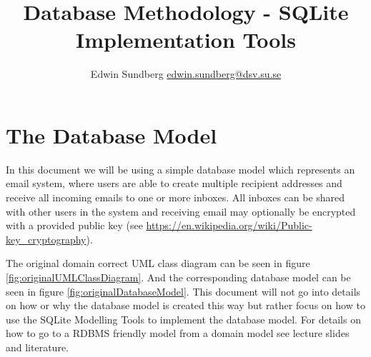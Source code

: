 \documentclass[a4paper,11pt,oneside]{article}
\title{Database Methodology - SQLite Implementation Tools}
\author{Edwin Sundberg \url{edwin.sundberg@dsv.su.se}}
\begin{document}
\maketitle \pagebreak

\begin{sloppypar}  

\tableofcontents \pagebreak




\section{The Database Model}
\label{exampleDatabaseModel}
In this document we will be using a simple database model which represents an email system, where users are able to create multiple recipient addresses and receive all incoming emails to one or more inboxes. All inboxes can be shared with other users in the system and receiving email may optionally be encrypted with a provided public key (see \url{https://en.wikipedia.org/wiki/Public-key_cryptography}). 

The original domain correct UML class diagram can be seen in figure \autoref{fig:originalUMLClassDiagram}. And the corresponding database model can be seen in figure \autoref{fig:originalDatabaseModel}. This document will not go into details on how or why the database model is created this way but rather focus on how to use the SQLite Modelling Tools to implement the database model. For details on how to go to a RDBMS friendly model from a domain model see lecture slides and literature.


\end{sloppypar}
\end{document}
